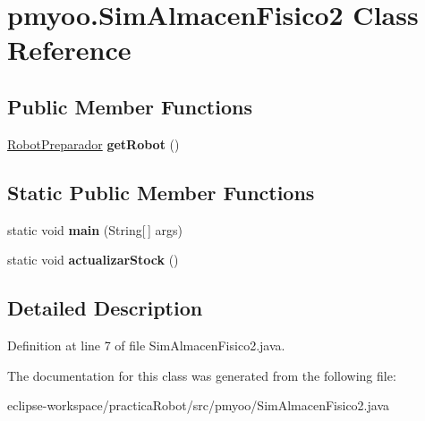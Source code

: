 \hypertarget{classpmyoo_1_1_sim_almacen_fisico2}{}\section{pmyoo.\+Sim\+Almacen\+Fisico2 Class Reference}
\label{classpmyoo_1_1_sim_almacen_fisico2}
\subsection*{Public Member Functions}
\begin{DoxyCompactItemize}
\item 
\mbox{\label{classpmyoo_1_1_sim_almacen_fisico2_a320616b7a7212efea938c89ba99318ed}} 
\mbox{\hyperlink{classpmyoo_1_1_robot_preparador}{Robot\+Preparador}} {\bfseries get\+Robot} ()
\end{DoxyCompactItemize}
\subsection*{Static Public Member Functions}
\begin{DoxyCompactItemize}
\item 
\mbox{\label{classpmyoo_1_1_sim_almacen_fisico2_ac09ed68f6ad0bb7380027bac83e2aa8f}} 
static void {\bfseries main} (String\mbox{[}$\,$\mbox{]} args)
\item 
\mbox{\label{classpmyoo_1_1_sim_almacen_fisico2_a4a5a3b6c2da5d4c6285e3adf5aad5bb3}} 
static void {\bfseries actualizar\+Stock} ()
\end{DoxyCompactItemize}


\subsection{Detailed Description}


Definition at line 7 of file Sim\+Almacen\+Fisico2.\+java.



The documentation for this class was generated from the following file\+:\begin{DoxyCompactItemize}
\item 
eclipse-\/workspace/practica\+Robot/src/pmyoo/Sim\+Almacen\+Fisico2.\+java\end{DoxyCompactItemize}
